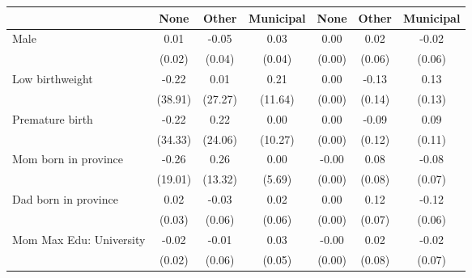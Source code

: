 {
\def\sym#1{\ifmmode^{#1}\else\(^{#1}\)\fi}
\begin{tabular}{l*{6}{c}}
\toprule
                    &\multicolumn{1}{c}{None}&\multicolumn{1}{c}{Other}&\multicolumn{1}{c}{Municipal}&\multicolumn{1}{c}{None}&\multicolumn{1}{c}{Other}&\multicolumn{1}{c}{Municipal}\\
\midrule
Male                &        0.01         &       -0.05         &        0.03         &        0.00         &        0.02         &       -0.02         \\
                    &      (0.02)         &      (0.04)         &      (0.04)         &      (0.00)         &      (0.06)         &      (0.06)         \\
\addlinespace
Low birthweight     &       -0.22         &        0.01         &        0.21         &        0.00         &       -0.13         &        0.13         \\
                    &     (38.91)         &     (27.27)         &     (11.64)         &      (0.00)         &      (0.14)         &      (0.13)         \\
\addlinespace
Premature birth     &       -0.22         &        0.22         &        0.00         &        0.00         &       -0.09         &        0.09         \\
                    &     (34.33)         &     (24.06)         &     (10.27)         &      (0.00)         &      (0.12)         &      (0.11)         \\
\addlinespace
Mom born in province&       -0.26         &        0.26         &        0.00         &       -0.00         &        0.08         &       -0.08         \\
                    &     (19.01)         &     (13.32)         &      (5.69)         &      (0.00)         &      (0.08)         &      (0.07)         \\
\addlinespace
Dad born in province&        0.02         &       -0.03         &        0.02         &        0.00         &        0.12         &       -0.12         \\
                    &      (0.03)         &      (0.06)         &      (0.06)         &      (0.00)         &      (0.07)         &      (0.06)         \\
\addlinespace
Mom Max Edu: University&       -0.02         &       -0.01         &        0.03         &       -0.00         &        0.02         &       -0.02         \\
                    &      (0.02)         &      (0.06)         &      (0.05)         &      (0.00)         &      (0.08)         &      (0.07)         \\

\end{tabular}}
